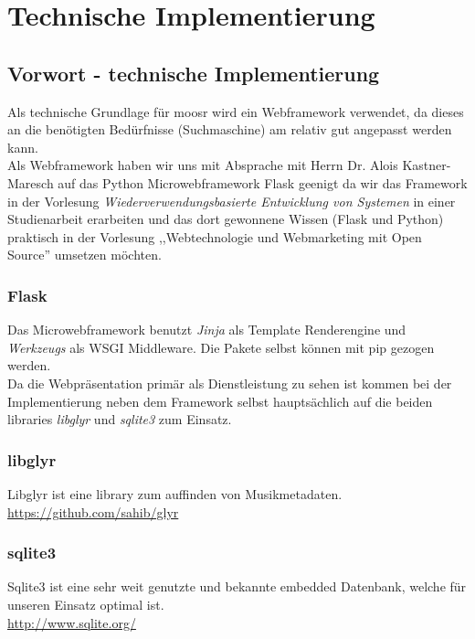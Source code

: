\chapter{Technische Implementierung}

\section{Vorwort - technische Implementierung}
Als technische Grundlage für moosr wird ein Webframework verwendet, da dieses an
die benötigten Bedürfnisse (Suchmaschine) am relativ gut angepasst werden kann.
\\
Als Webframework haben wir uns mit Absprache mit Herrn Dr. Alois
Kastner-Maresch auf das Python Microwebframework Flask geenigt da wir das
Framework in der Vorlesung \emph{Wiederverwendungsbasierte Entwicklung von
Systemen} in einer Studienarbeit erarbeiten und das dort gewonnene Wissen (Flask
und Python) praktisch in der Vorlesung ,,Webtechnologie und Webmarketing 
mit Open Source'' umsetzen möchten.

\subsection{Flask}
Das Microwebframework benutzt \emph{Jinja} als Template Renderengine und
\emph{Werkzeugs} als WSGI Middleware. Die Pakete selbst können mit pip gezogen
werden.
\\
Da die Webpräsentation primär als Dienstleistung zu sehen ist kommen bei der
Implementierung neben dem Framework selbst hauptsächlich auf die beiden
libraries \emph{libglyr} und \emph{sqlite3} zum Einsatz.

\subsection{libglyr}
Libglyr ist eine library zum auffinden von Musikmetadaten. 
\\
\url{https://github.com/sahib/glyr}

\subsection{sqlite3}
Sqlite3 ist eine sehr weit genutzte und bekannte embedded Datenbank, welche für
unseren Einsatz optimal ist.
\\
\url{http://www.sqlite.org/}
